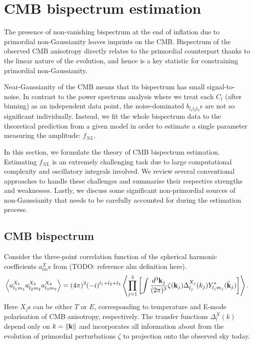 \section{CMB bispectrum estimation} \label{section:CMB_bispectrum_estimation}

The presence of non-vanishing bispectrum at the end of inflation due to primordial non-Gaussianity leaves imprints on the CMB. Bispectrum of the observed CMB anisotropy directly relates to the primordial counterpart thanks to the linear nature of the evolution, and hence is a key statistic for constraining primordial non-Gaussianity.

Near-Gaussianity of the CMB means that its bispectrum has small signal-to-noise. In contrast to the power spectrum analysis where we treat each $C_l$ (after binning) as an independent data point, the noise-dominated $b_{l_1 l_2 l_3}$s are not so significant individually. Instead, we fit the whole bispectrum data to the theoretical prediction from a given model in order to estimate a single parameter measuring the amplitude: $f_{NL}$.

In this section, we formulate the theory of CMB bispectrum estimation. Estimating $f_{NL}$ is an extremely challenging task due to large computational complexity and oscillatory integrals involved. We review several conventional approaches to handle these challenges and summarise their respective strengths and weaknesses. Lastly, we discuss some significant non-primordial sources of non-Gaussianity that needs to be carefully accounted for during the estimation process.


\subsection{CMB bispectrum}

Consider the three-point correlation function of the spherical harmonic coefficients $a_{lm}^X$s from (TODO: reference alm definition here).
\begin{align}
	\left< a_{l_1 m_1}^{X_1} a_{l_2 m_2}^{X_2} a_{l_3 m_3}^{X_3}  \right> = (4\pi)^3 (-i)^{l_1 + l_2 + l_3} \left< \prod_{j=1}^{3} \left[ \int \frac{d^3\mathbf{k}_j}{(2\pi)^3} \zeta(\mathbf{k}_j)   \Delta_{l_j}^{X_j} (k_j) Y^*_{l_j m_j} (\hat{\mathbf{k}}_j) \right] \right>. \label{eqn:bispectrum_derivation_base_form}
\end{align}
Here $X_j$s can be either $T$ or $E$, corresponding to temperature and E-mode polarisation of CMB anisotropy, respectively. The transfer functions $\Delta_l^X (k)$ depend only on $k=\left\| \mathbf{k} \right\|$ and incorporates all information about from the evolution of primordial perturbations $\zeta$ to projection onto the observed sky today.

